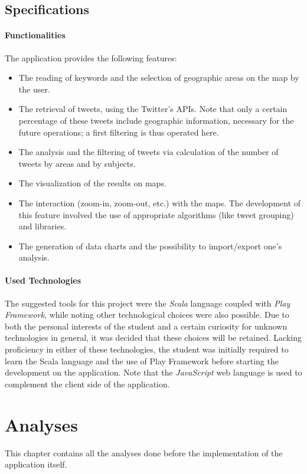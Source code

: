 \documentclass[a4paper,11pt]{report}
\begin{document}
\section{Specifications}
\subsubsection{Functionalities}
The application provides the following features:
\begin{itemize}
	\item The reading of keywords and the selection of geographic areas on the map by the user.
	\item The retrieval of tweets, using the Twitter's APIs.
		Note that only a certain percentage of these tweets include geographic information, necessary for the future operations; a first filtering is thus operated here.
	\item The analysis and the filtering of tweets via calculation of the number of tweets by areas and by subjects.
	\item The visualization of the results on maps.
	\item The interaction (zoom-in, zoom-out, etc.) with the maps. The development of this feature involved the use of appropriate algorithms (like tweet grouping) and libraries.
	\item The generation of data charts and the possibility to import/export one's analysis.
\end{itemize}

\subsubsection{Used Technologies}
The suggested tools for this project were the \emph{Scala} language coupled with \emph{Play Framework}, while noting other technological choices were also possible. Due to both the personal interests of the student and a certain curiosity for unknown technologies in general, it was decided that these choices will be retained.
Lacking proficiency in either of these technologies, the student was initially required to learn the Scala language and the use of Play Framework before starting the development on the application.
Note that the \emph{JavaScript} web language is used to complement the client side of the application.

\chapter{Analyses}
This chapter contains all the analyses done before the implementation of the application itself.
\end{document}
